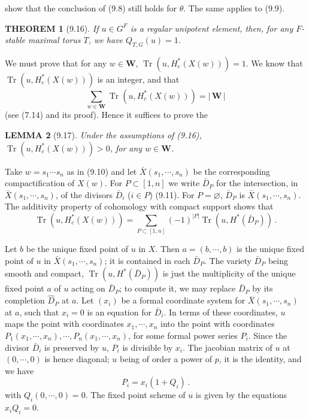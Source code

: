 \documentclass{amsart}
\theoremstyle{plain}
\newtheorem{theorem}{THEOREM}[section]
\newtheorem{lemma}[theorem]{LEMMA}
\theoremstyle{remark}
\DeclareMathOperator{\Tr}{Tr}
\begin{document}
 show that the conclusion of (9.8) still holds for $\theta$. The same applies to (9.9).

\begin{theorem}[9.16]
If $u \in G^F$ is a regular unipotent element, then, for any $F$-stable maximal torus $T$, we have $Q_{T,G}(u) = 1$.
\end{theorem}

We must prove that for any $w \in \mathbf{W}$, $\Tr(u, H_c^*(X(w))) = 1$. We know that $\Tr(u, H_c^*(X(w)))$ is an integer, and that
\[
\sum_{w \in \mathbf{W}} \Tr(u, H_c^*(X(w))) = |\,\mathbf{W}\,|
\]
(see (7.14) and its proof). Hence it suffices to prove the

\begin{lemma}[9.17]
Under the assumptions of (9.16), $\Tr(u, H_c^*(X(w))) > 0$, for any $w \in \mathbf{W}$.
\end{lemma}

Take $w = s_1 \cdots s_n$ as in (9.10) and let $\bar{X}(s_1, \cdots, s_n)$ be the corresponding compactification of $X(w)$. For $P \subset [1, n]$ we write $\bar{D}_P$ for the intersection, in $\bar{X}(s_1, \cdots, s_n)$, of the divisors $\bar{D}_i$ ($i \in P$) (9.11). For $P = \varnothing$, $\bar{D}_P$ is $\bar{X}(s_1, \cdots, s_n)$. The additivity property of cohomology with compact support shows that
\begin{equation}\label{eq:9.17.1}
\Tr(u, H_c^*(X(w))) = \sum_{P \subset [1,n]} (-1)^{|P|} \Tr(u, H^*(\bar{D}_P))\,.
\end{equation}

Let $b$ be the unique fixed point of $u$ in $X$. Then $a = (b, \cdots, b)$ is the unique fixed point of $u$ in $\bar{X}(s_1, \cdots, s_n)$; it is contained in each $\bar{D}_P$. The variety $\bar{D}_P$ being smooth and compact, $\Tr(u, H^*(\bar{D}_P))$ is just the multiplicity of the unique fixed point $a$ of $u$ acting on $\bar{D}_P$; to compute it, we may replace $\bar{D}_P$ by its completion $\hat{D}_P$ at $a$. Let $(x_i)$ be a formal coordinate system for $\bar{X}(s_1, \cdots, s_n)$ at $a$, such that $x_i = 0$ is an equation for $\bar{D}_i$. In terms of these coordinates, $u$ maps the point with coordinates $x_1, \cdots, x_n$ into the point with coordinates $P_1(x_1, \cdots, x_n), \cdots, P_n(x_1, \cdots, x_n)$, for some formal power series $P_i$. Since the divisor $\bar{D}_i$ is preserved by $u$, $P_i$ is divisible by $x_i$. The jacobian matrix of $u$ at $(0, \cdots, 0)$ is hence diagonal; $u$ being of order a power of $p$, it is the identity, and we have
\[
P_i = x_i(1 + Q_i)\,.
\]
with $Q_i(0, \cdots, 0) = 0$. The fixed point scheme of $u$ is given by the equations $x_i Q_i = 0$.
\end{document}
